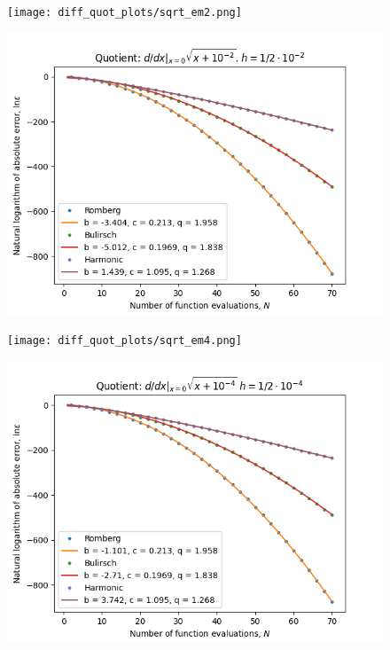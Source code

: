 \begin{figure}[H]
\centering
\begin{minipage}{0.45\textwidth}
\centering
\texttt{[image: diff\_quot\_plots/sqrt\_em2.png]}
\end{minipage}
\begin{minipage}{0.45\textwidth}
\centering
\includegraphics[scale=0.45]{diff_quot_plots/sqrt_em2_hp_trend.png}
\end{minipage}
\end{figure}


\begin{figure}[H]
\centering
\begin{minipage}{0.45\textwidth}
\centering
\texttt{[image: diff\_quot\_plots/sqrt\_em4.png]}
\end{minipage}
\begin{minipage}{0.45\textwidth}
\centering
\includegraphics[scale=0.45]{diff_quot_plots/sqrt_em4_hp_trend.png}
\end{minipage}
\end{figure}


